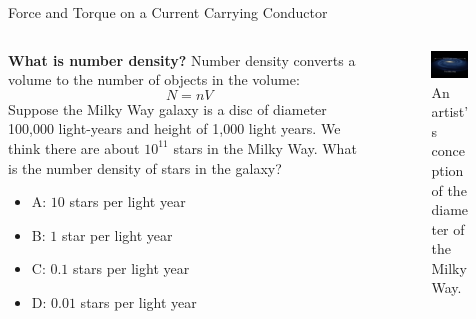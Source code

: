 \documentclass{beamer}
\begin{document}
\begin{frame}{Force and Torque on a Current Carrying Conductor}
\begin{columns}[T]
\begin{column}{0.5\textwidth}
\footnotesize
\textbf{\alert{What is number density?}} Number density converts a volume to the number of objects in the volume:
\begin{equation}
\boxed{N = nV}
\end{equation}
Suppose the Milky Way galaxy is a disc of diameter 100,000 light-years and height of 1,000 light years.  We think there are about $10^{11}$ stars in the Milky Way.  What is the number density of stars in the galaxy?
\begin{itemize}
\item A: $10$ stars per light year
\item B: $1$ star per light year
\item C: $0.1$ stars per light year
\item D: $0.01$ stars per light year
\end{itemize}
\end{column}
\begin{column}{0.5\textwidth}
\begin{figure}
\centering
\includegraphics[width=0.9\textwidth]{figures/milky_way.jpg}
\caption{\label{fig:milky} An artist's conception of the diameter of the Milky Way.}
\end{figure}
\end{column}
\end{columns}
\end{frame}
\end{document}

